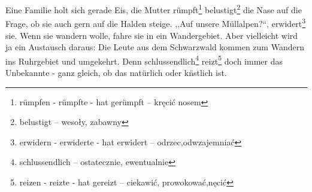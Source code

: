 \documentclass[twoside]{article}
\begin{document}
\begin{multicols}{2}
 Eine Familie holt sich gerade Eis, die Mutter r\"umpft\footnote{r\"umpfen - r\"umpfte - hat ger\"umpft -- kr\k{e}ci\'c nosem} belustigt\footnote{belustigt -- weso\l{}y, zabawny}
 die Nase auf die Frage, ob sie auch gern auf die Halden steige. ,,Auf unsere M\"ullalpen?``, erwidert\footnote{erwidern - erwiderte - hat erwidert -- odrzec,odwzajemnia\'c} sie.
 Wenn sie wandern wolle, fahre sie in ein Wandergebiet. Aber vielleicht wird ja ein Austausch
 daraus: Die Leute aus dem Schwarzwald kommen zum Wandern ins Ruhrgebiet und umgekehrt. Denn schlussendlich\footnote{schlussendlich -- ostatecznie, ewentualnie}
 reizt\footnote{reizen - reizte - hat gereizt -- ciekawi\'c, prowokowa\'c,n\k{e}ci\'c} doch immer das Unbekannte - ganz gleich, ob das nat\"urlich oder k\"nstlich ist.


\end{multicols}
\end{document}
